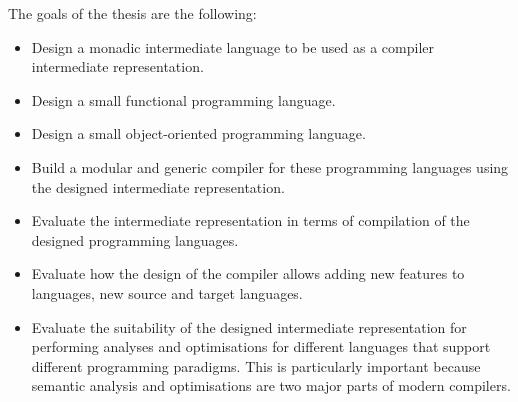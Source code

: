 \documentclass{article}
\begin{document}
The goals of the thesis are the following:
\begin{itemize}
  \item Design a monadic intermediate language to be used as a compiler intermediate representation.
  \item Design a small functional programming language.
  \item Design a small object-oriented programming language.
  \item Build a modular and generic compiler for these programming languages using the designed intermediate representation.
  \item Evaluate the intermediate representation in terms of compilation of the designed programming languages.
  \item Evaluate how the design of the compiler allows adding new features to languages, new source and target languages.
  \item Evaluate the suitability of the designed intermediate representation for
    performing analyses and optimisations for different languages that support different programming paradigms.
    This is particularly important because semantic analysis and optimisations are two major parts of modern compilers.
\end{itemize}



\end{document}
